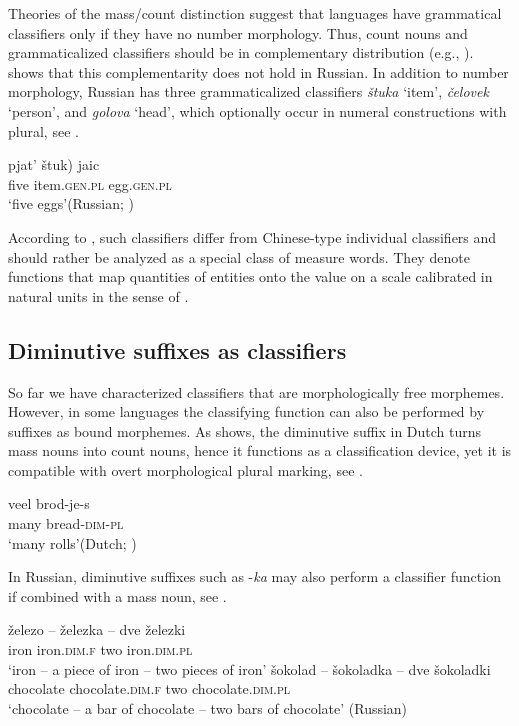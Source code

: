\documentclass[output=paper,
colorlinks,
citecolor=brown,
newtxmath
]{langscibook}
\begin{document}
Theories of the mass/count distinction suggest that languages have grammatical classifiers only if they have no number morphology. Thus, count nouns and grammaticalized classifiers should be in complementary distribution (e.g., \citealt{Borer2005, Chierchia2010}). \cite{Khrizman2016} shows that this complementarity does not hold in Russian. In addition to number morphology, Russian has three grammaticalized classifiers \textit{štuka} `item', \textit{čelovek} `person', and \textit{golova} `head', which optionally occur in numeral constructions with plural, see .

\ea \label{ex:16}
\gll pjat' \minsp{(} štuk) jaic\\
    five {} item.\textsc{gen.pl} egg.\textsc{gen.pl}\\
\glt `five eggs'\hfill (Russian; \citealt{Khrizman2016})
\z

\noindent According to \cite{Khrizman2016}, such classifiers differ from Chinese-type individual classifiers and should rather be analyzed as a special class of measure words. They denote functions that map quantities of entities onto the value on a scale calibrated in natural units in the sense of \cite{Krifka1989,Krifka1995}.



\subsection{Diminutive suffixes as classifiers}

So far we have characterized classifiers that are morphologically free morphemes. However, in some languages the classifying function can also be performed by suffixes as bound morphemes.  As \cite{DeBelder2008} shows, the diminutive suffix in Dutch turns mass nouns into count nouns, hence it functions as a classification device, yet it is compatible with overt morphological plural marking, see .

\ea \label{ex:17}
\gll veel brod-je-s\\
   many bread-\textsc{dim-pl} \\
\glt `many rolls'\hfill (Dutch; \citealt[2]{DeBelder2008})
\z

\noindent In Russian, diminutive suffixes such as -\textit{ka} may also perform a classifier function if combined with a mass noun, see .

\ea \label{ex:18}
\ea
\gll železo -- železka -- dve železki \\
iron {} iron.\textsc{dim.f} {} two iron.\textsc{dim.pl}\\
\glt `iron -- a piece of iron -- two pieces of iron'
\ex
\gll  šokolad -- šokoladka -- dve šokoladki\\
chocolate {}	chocolate.\textsc{dim.f} {} two chocolate.\textsc{dim.pl}\\
\glt `chocolate -- a bar of chocolate -- two bars of chocolate' \hfill (Russian)
\z \z
\end{document}
